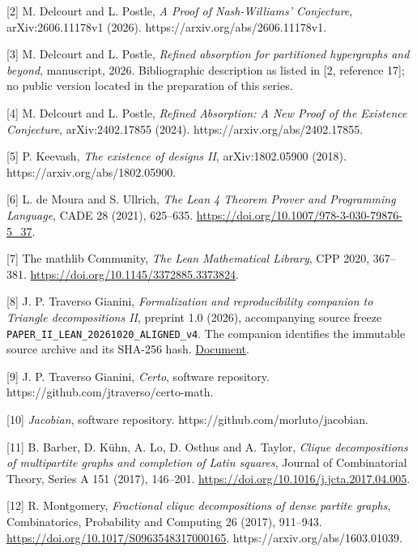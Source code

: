 \documentclass[english,11pt,a4paper]{article}
\begin{document}
{[}2{]} M. Delcourt and L. Postle, \emph{A Proof of Nash-Williams' Conjecture}, arXiv:2606.11178v1 (2026). https://arxiv.org/abs/2606.11178v1.

{[}3{]} M. Delcourt and L. Postle, \emph{Refined absorption for partitioned hypergraphs and beyond}, manuscript, 2026. Bibliographic description as listed in {[}2, reference 17{]}; no public version located in the preparation of this series.

{[}4{]} M. Delcourt and L. Postle, \emph{Refined Absorption: A New Proof of the Existence Conjecture}, arXiv:2402.17855 (2024). https://arxiv.org/abs/2402.17855.

{[}5{]} P. Keevash, \emph{The existence of designs II}, arXiv:1802.05900 (2018). https://arxiv.org/abs/1802.05900.

{[}6{]} L. de Moura and S. Ullrich, \emph{The Lean 4 Theorem Prover and Programming Language}, CADE 28 (2021), 625--635. \url{https://doi.org/10.1007/978-3-030-79876-5_37}.

{[}7{]} The mathlib Community, \emph{The Lean Mathematical Library}, CPP 2020, 367--381. \url{https://doi.org/10.1145/3372885.3373824}.

{[}8{]} J. P. Traverso Gianini, \emph{Formalization and reproducibility companion to Triangle decompositions II}, preprint 1.0 (2026), accompanying source freeze \texttt{PAPER\_\allowbreak{}II\_\allowbreak{}LEA\allowbreak{}N\_\allowbreak{}20261020\_\allowbreak{}A\allowbreak{}LIGNED\_\allowbreak{}v4}. The companion identifies the immutable source archive and its SHA-256 hash. \href{https://github.com/jtraverso/nash-williams-triangle-decompositions-release/blob/main/preprints/PAPER_II/05_formalization/FORMALIZATION_COMPANION_preprint_v1.0_en.md}{Document}.

{[}9{]} J. P. Traverso Gianini, \emph{Certo}, software repository. https://github.com/jtraverso/certo-math.

{[}10{]} \emph{Jacobian}, software repository. https://github.com/morluto/jacobian.

{[}11{]} B. Barber, D. Kühn, A. Lo, D. Osthus and A. Taylor, \emph{Clique decompositions of multipartite graphs and completion of Latin squares}, Journal of Combinatorial Theory, Series A 151 (2017), 146--201. \url{https://doi.org/10.1016/j.jcta.2017.04.005}.

{[}12{]} R. Montgomery, \emph{Fractional clique decompositions of dense partite graphs}, Combinatorics, Probability and Computing 26 (2017), 911--943. \url{https://doi.org/10.1017/S0963548317000165}. https://arxiv.org/abs/1603.01039.
\end{document}
